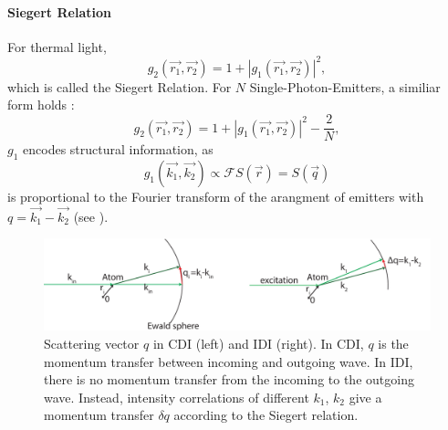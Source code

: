 \paragraph{Siegert Relation}
For thermal light, 
\begin{equation}
	g_2(\vec{r_1},\vec{r_2}) = 1+ |g_1(\vec{r_1},\vec{r_2}) |^2 ,
\end{equation}
which is called the Siegert Relation.
For $N$ Single-Photon-Emitters, a similiar form holds \cite{classen2017}:
\begin{equation}
	g_2(\vec{r_1},\vec{r_2}) = 1+ |g_1(\vec{r_1},\vec{r_2}) |^2 - \frac{2}{N} ,
\end{equation}
$g_1$ encodes structural information, as 
\begin{equation}
g_1(\vec{k_1},\vec{k_2}) \propto \mathscr{F}S(\vec{r}) = S(\vec{q})
\end{equation}
is proportional to the Fourier transform of the arangment of emitters with $q=\vec{k_1}-\vec{k_2}$ (see ).
 \begin{figure}
	\centering
	\includegraphics[width=0.9\linewidth]{images/scatteringvectors.pdf}
	\caption[Scattering Vectors]{Scattering vector $q$ in CDI (left) and IDI (right). In CDI, $q$ is the momentum transfer between incoming and outgoing wave. In IDI, there is no momentum transfer from the incoming to the outgoing wave. Instead, intensity correlations of different $k_1$, $k_2$ give a momentum transfer $\delta q$ according to the Siegert relation.}
	\label{fig:scatteringvectors}
	
\end{figure}

